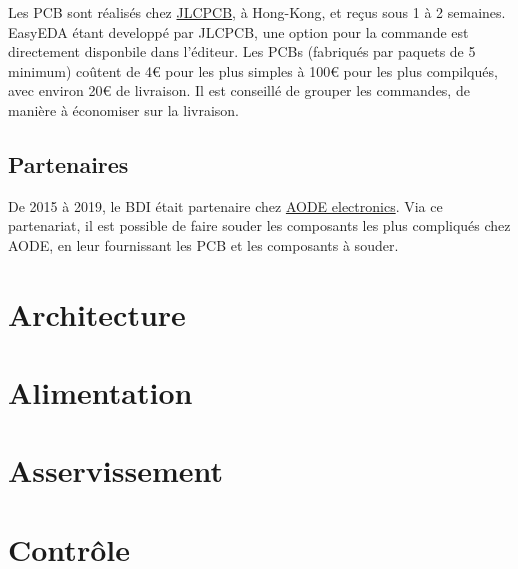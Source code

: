 \documentclass[a4paper,10pt]{refart}
\begin{document}
	Les PCB sont réalisés chez \href{https://jlcpcb.com/}{JLCPCB}, à 
	Hong-Kong, et reçus sous 1 à 2 semaines. EasyEDA étant developpé par 
	JLCPCB, une option pour la commande est directement disponbile dans 
	l'éditeur. Les PCBs (fabriqués par paquets de 5 minimum) coûtent de 4€ pour 
	les plus simples à 100€ pour les plus compilqués, avec environ 20€ de 
	livraison. Il est conseillé de grouper les commandes, de manière à 
	économiser sur la livraison.

\subsection{Partenaires}
	De 2015 à 2019, le BDI était partenaire chez 
	\href{http://www.aode-electronics.com/}{AODE electronics}. Via ce 
	partenariat, il est possible de faire souder les composants les plus
	compliqués chez AODE, en leur fournissant les PCB et les composants à 
	souder.

\section{Architecture}

\section{Alimentation}

\section{Asservissement}

\section{Contrôle}

\end{document}
